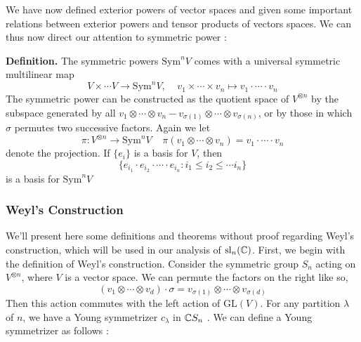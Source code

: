 \documentclass[11pt, a4paper, oneside]{article}
\theoremstyle{plain}
\theoremstyle{definition}
\theoremstyle{example}
\def\GL{\mathrm{GL}} \def\SL{\mathrm{SL}} \def\sl{\mathrm{sl}} \def\gl{\mathrm{gl}} \def\SO{\mathrm{SO}} \def\SU{\mathrm{SU}}  \def\SP{\mathrm{SP}} \def\g{\mathfrak{g}} \def\h{\mathfrak{h}} \def\Sym{\mathrm{Sym}}
\begin{document}
\par
We have now defined exterior powers of vector spaces and given some important relations between exterior powers and tensor products of vectors spaces. We can thus now direct our attention to symmetric power \cite[\S B.2]{fulton}:

\par
\textbf{Definition.} The symmetric powers $\Sym^n V$ comes with a universal symmetric multilinear map $$V \times \cdots V \to \Sym^nV, \; \; \; \; v_1 \times \cdots \times v_n \mapsto v_1 \cdot \cdots \cdot v_n$$  The symmetric power can be constructed as the quotient space of $V^{\otimes n}$ by the subspace generated by all $v_1 \otimes \cdots \otimes v_n - v_{\sigma(1)} \otimes \cdots \otimes v_{\sigma(n)}$, or by those in which $\sigma$ permutes two successive factors. Again we let $$\pi: V^{\otimes n} \to \Sym^n V \; \; \; \; \pi(v_1 \otimes \cdots \otimes v_n) = v_1 \cdot \cdots \cdot v_n$$ denote the projection. If $\{e_i\}$ is a basis for $V$, then $$\{e_{i_1} \cdot e_{i_2} \cdot \cdots \cdot e_{i_n}: i_1 \leq i_2 \leq \cdots i_n\}$$ is a basis for $\Sym^n V$

\subsubsection{Weyl's Construction}

We'll present here some definitions and theorems without proof regarding Weyl's construction, which will be used in our analysis of $\sl_n(\CC)$. First, we begin with the definition of Weyl's construction. Consider the symmetric group $S_n$ acting on $V^{\otimes n}$, where $V$ is a vector space. We can permute the factors on the right like so, $$(v_1 \otimes \cdots \otimes v_d) \cdot \sigma = v_{\sigma(1)} \otimes \cdots \otimes v_{\sigma(d)}$$ Then this action commutes with the left action of $\GL(V)$. For any partition $\lambda$ of $n$, we have a Young symmetrizer $c_{\lambda}$ in $\mathbb{C} S_n$ \cite[\S 6.1]{fulton}. We can define a Young symmetrizer as follows \cite{youngwiki}:
\end{document}
